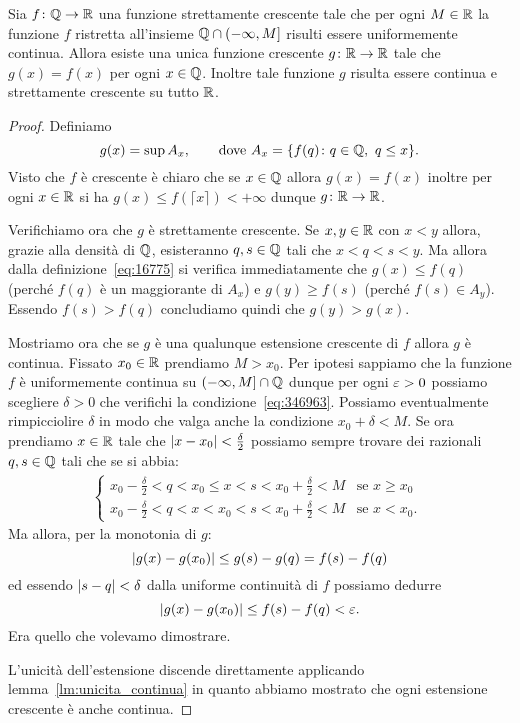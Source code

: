 \begin{lemma}
\label{lm:estensione_monotona}%
Sia $f\colon \mathbb Q\to \mathbb R$ una funzione
strettamente crescente
tale che per ogni $M\in \mathbb R$ la funzione
$f$ ristretta all'insieme
$\mathbb Q \cap (-\infty,M]$ risulti essere uniformemente
continua.
Allora esiste una unica funzione crescente
$g\colon \mathbb R\to\mathbb R$
tale che $g(x)=f(x)$ per ogni $x\in \mathbb Q$.
Inoltre tale funzione $g$ risulta essere continua
e strettamente crescente su tutto $\mathbb R$.
\end{lemma}
%
\begin{proof}
Definiamo
\begin{equation}\label{eq:16775}
  g(x) = \sup A_x,
  \qquad \text{dove }
  A_x = {\left\{ f(q)\colon q\in \mathbb Q,\ q\le x \right\}}.
\end{equation}
Visto che $f$ è crescente è chiaro che se $x\in\mathbb Q$
allora $g(x) = f(x)$ inoltre per ogni $x\in \mathbb R$
si ha $g(x)\le f(\lceil x\rceil)<+\infty$
dunque $g\colon \mathbb R\to\mathbb R$.

Verifichiamo ora che $g$ è strettamente crescente.
Se $x,y\in \mathbb R$ con $x<y$ allora,
grazie alla densità di $\mathbb Q$,
esisteranno $q,s\in \mathbb Q$ tali che $x<q<s<y$.
Ma allora dalla definizione~\eqref{eq:16775}
si verifica immediatamente che $g(x)\le f(q)$
(perché $f(q)$ è un maggiorante di $A_x$)
e $g(y)\ge f(s)$ (perché $f(s)\in A_y$).
Essendo $f(s)>f(q)$
concludiamo quindi che $g(y)> g(x)$.

Mostriamo ora che se $g$ è una qualunque
estensione crescente di $f$ allora $g$
è continua.
Fissato $x_0\in \mathbb R$ prendiamo $M>x_0$.
Per ipotesi sappiamo che la funzione $f$
è uniformemente continua su $(-\infty,M]\cap \mathbb Q$
dunque per ogni $\varepsilon>0$ possiamo
scegliere $\delta>0$
che verifichi la condizione~\eqref{eq:346963}.
Possiamo eventualmente rimpicciolire $\delta$
in modo che valga anche la condizione $x_0+\delta < M$.
Se ora prendiamo $x\in \mathbb R$ tale che ${\left|x-x_0\right|}<\frac\delta 2$
possiamo sempre trovare dei razionali $q,s\in \mathbb Q$
tali che se si abbia:
\begin{align*}
\begin{cases}
  x_0 - \frac\delta 2 < q < x_0 \le x < s < x_0 + \frac \delta 2 < M
  & \text{se $x\ge x_0$ }\\
  x_0 - \frac \delta 2 < q < x < x_0 < s < x_0 + \frac \delta 2 < M
  & \text{se $x<x_0$}.
\end{cases}
\end{align*}
Ma allora, per la monotonia di $g$:
\[
  {\left|g(x)-g(x_0)\right|} \le g(s)-g(q) = f(s)-f(q)
\]
ed essendo ${\left|s-q\right|} < \delta$ dalla uniforme
continuità di $f$ possiamo dedurre
\[
  {\left|g(x)-g(x_0)\right|} \le f(s)-f(q) < \varepsilon.
\]
Era quello che volevamo dimostrare.

L'unicità dell'estensione discende direttamente
applicando lemma~\ref{lm:unicita_continua}
in quanto abbiamo mostrato che
ogni estensione crescente è anche continua.
\end{proof}


